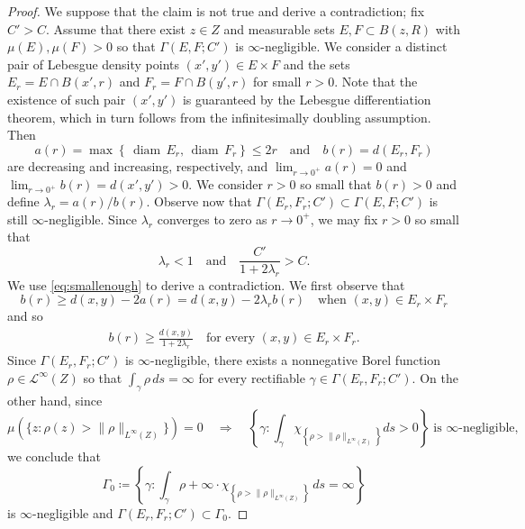 \documentclass[reqno]{amsart}
\numberwithin{equation}{section}
\theoremstyle{remark}
\DeclareMathOperator{\diam}{diam}
\def\diam{{\mathop\mathrm{\,diam\,}}}
\begin{document}
\begin{proof}
We suppose that the claim is not true and derive a contradiction; fix $C' > C$. Assume that there exist $z \in Z$ and measurable sets $E, F \subset B( z, R )$ with $\mu( E ), \mu( F ) > 0$ so that $\Gamma( E, F; C' )$ is $\infty$-negligible. We consider a distinct pair of Lebesgue density points $( x', y' ) \in E \times F$ and the sets $E_r = E \cap B( x', r )$ and $F_r = F \cap B(y',r)$ for small $r > 0$.  Note that the existence of such pair $(x',y')$ is guaranteed by the Lebesgue differentiation theorem, which in turn follows from the infinitesimally doubling assumption. Then
\begin{equation*}
    a(r) = \max\left\{ \diam E_{r}, \diam F_{r} \right\} \leq 2r
    \quad\text{and}\quad
    b(r) = d( E_{r}, F_{r} ) 
\end{equation*}
are decreasing and increasing, respectively, and $\lim_{ r \rightarrow 0^{+} } a(r) = 0$ and $\lim_{ r \rightarrow 0^{+} } b(r) = d(x',y') > 0$. We consider $r > 0$ so small that $b(r) > 0$ and define $\lambda_r = a(r)/b(r)$. Observe now that $\Gamma( E_{r}, F_{r}; C' ) \subset \Gamma( E, F; C' )$ is still $\infty$-negligible. Since $\lambda_r$ converges to zero as $r \rightarrow 0^{+}$, we may fix $r > 0$ so small that
\begin{equation}\label{eq:smallenough}
    \lambda_r < 1 \quad\text{and}\quad \frac{ C' }{ 1 + 2 \lambda_r } > C.
\end{equation}
We use \eqref{eq:smallenough} to derive a contradiction. We first observe that
\begin{equation*}
    b(r) \geq d(x,y) - 2a(r) = d(x,y) - 2 \lambda_r b(r)
    \quad\text{when $(x,y) \in E_r \times F_r$}
\end{equation*}
and so
\begin{align}\label{eq:pointwiseinequality}
    b(r) \geq \frac{ d(x,y) }{ 1 + 2 \lambda_r }
    \quad\text{for every $(x,y) \in E_r \times F_r$.}
\end{align}
Since $\Gamma( E_r, F_r; C' )$ is $\infty$-negligible, there exists a  nonnegative Borel function $\rho\in \mathcal{L}^{\infty}( Z )$ so that  $\int_{\gamma} \rho\, ds=\infty$ for every rectifiable $\gamma\in \Gamma( E_r, F_r; C' )$. On the other hand, since $$\mu (\{z \colon \rho(z)>\|\rho\|_{L^{\infty}(Z)}\})=0\quad \Rightarrow\quad \left\{\gamma \colon \int_\gamma \chi_{\left\{\rho > \|\rho\|_{L^{\infty}(Z)}  \right\}}ds>0\right\} \;\text{is $\infty$-negligible,}$$ we conclude that 
\begin{equation}\label{eq:negligibleset}
    \Gamma_{0}
    \coloneqq
    \left\{
        \gamma
        \colon
        \int_{ \gamma } \rho + \infty \cdot \chi_{ \left\{ \rho > \|\rho\|_{L^{\infty}(Z)} \right\} } \,ds = \infty
    \right\}
\end{equation}
is $\infty$-negligible and $\Gamma( E_r, F_r; C' ) \subset \Gamma_0$.


\end{proof}
\end{document}
